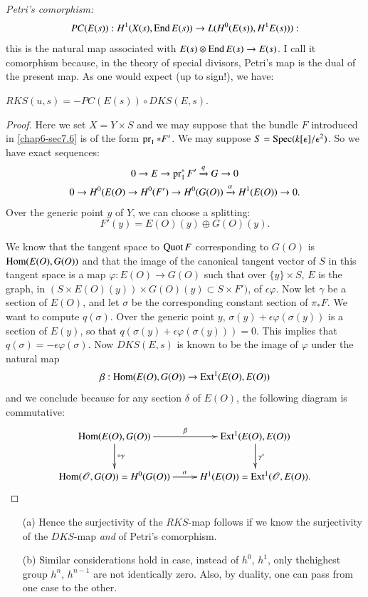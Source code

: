 \noindent
{\em Petri's comorphism:}
$$
PC(E(s)):H^{1}(X(s),\operatorname{End} E(s))\to L(H^{0}(E(s)),H^{1}E(s))):
$$
this is the natural map associated with $E(s)\otimes \operatorname{End} E(s)\to
E(s)$. I call it comorphism because, in the theory of special
divisors, Petri's map is the dual of the present map. As one would
expect (up to sign!), we have:

\begin{prop*}
$RKS(u,s)=-PC(E(s))\circ DKS(E,s)$.
\end{prop*}

\begin{proof}
Here we set $X=Y\times S$ and we may suppose that the bundle $F$
introduced in \ref{chap6-sec7.6} is of the form $\operatorname{pr}_{1}\ast F'$. We
may suppose $S=\operatorname{Spec} (k[\epsilon]/\epsilon^{2})$. So we have exact
sequences: 
\begin{gather*}
0\to E\to \operatorname{pr}^{*}_{1}F'\xrightarrow{q}G\to 0\\
0\to H^{0}(E(O)\to H^{0}(F')\to
H^{0}(G(O))\xrightarrow{\alpha}H^{1}(E(O))\to 0.
\end{gather*}\pageoriginale 
Over the generic point $y$ of $Y$, we can choose a splitting:
$$
F'(y)=E(O)(y)\oplus G(O)(y).
$$


We know that the tangent space to $\operatorname{Quot} F$ corresponding to $G(O)$ is
$\operatorname{Hom}(E(O),G(O))$ and that the image of the canonical tangent vector
of $S$ in this tangent space is a map $\varphi:E(O)\to G(O)$ such that
over $\{y\}\times S$, $E$ is the graph, in $(S\times E(O)(y))\times
G(O)(y)\subset S\times F')$, of $\epsilon \varphi$. Now let $\gamma$
be a section of $E(O)$, and let $\sigma$ be the corresponding constant
section of $\pi_{\ast}F$. We want to compute $q(\sigma)$. Over the
generic point $y$, $\sigma(y)+\epsilon\varphi(\sigma(y))$ is a section
of $E(y)$, so that $q(\sigma(y)+\epsilon\varphi(\sigma(y)))=0$. This
implies that $q(\sigma)=-\epsilon\varphi(\sigma)$. Now $DKS(E,s)$ is
known to be the image of $\varphi$ under the natural map
$$
\beta : \operatorname{Hom}(E(O),G(O))\to \operatorname{Ext}^{1}(E(O),E(O))
$$
and we conclude because for any section $\delta$ of $E(O)$, the
following diagram is commutative:
\[
\xymatrix{
\Hom(E(O),G(O))\ar[d]^{\circ\gamma}\ar[r]^-{\beta}
& \Ext^{1}(E(O),E(O))\ar[d]^{\gamma^{\ast}}\\
\Hom(\mathscr{O},G(O))=H^{0}(G(O))\ar[r]^-{\alpha} &
H^{1}(E(O))=\Ext^{1}(\mathscr{O},E(O)). 
}
\]
\end{proof}

\begin{remarks*}
\begin{itemize}
\item[(a)] Hence the surjectivity of the $RKS$-map follows if we know
the surjectivity of the $DKS$-map {\em and} of Petri's comorphism.

\item[(b)] Similar considerations hold in case, instead of $h^{0}$,
$h^{1}$, only the\pageoriginale highest group $h^{n}$, $h^{n-1}$ are
not identically zero. Also, by duality, one can pass from one case to
the other. 
\end{itemize}
\end{remarks*}

